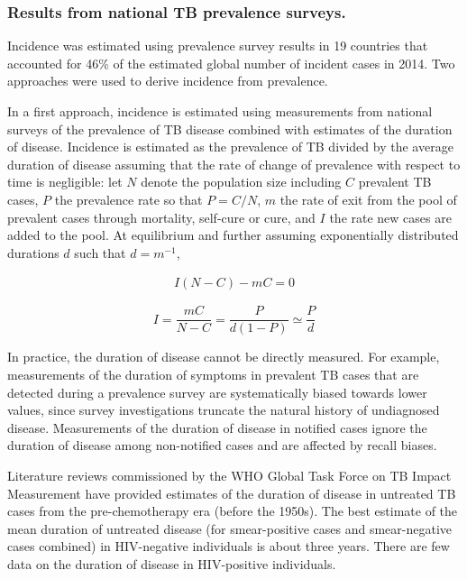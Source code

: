 \subsubsection {Results from national TB prevalence surveys.} Incidence was estimated using prevalence survey results in 19 countries that accounted for 46\% of the estimated global number of incident cases in 2014. Two approaches were used to derive incidence from prevalence.

In a first approach, incidence is estimated using measurements from national surveys of the prevalence of TB disease combined with estimates of the duration of disease. Incidence is estimated as the prevalence of TB divided by the average duration of disease assuming that the rate of change of prevalence with respect to time is negligible: let $N$ denote the population size including $C$ prevalent TB cases, $P$ the prevalence rate so that $P = C/N$, $m$ the rate of exit from the pool of prevalent cases through mortality, self-cure or cure, and $I$ the rate new cases are added to the pool. At equilibrium and further assuming exponentially distributed durations $d$ such that $d = m^{-1}$,

\begin{align*}
I(N - C) - m C = 0
\end{align*}

\begin{equation}
I = \frac{m C}{N - C} = \frac{P}{d(1 - P)} \simeq \frac{P}{d}
\label{eqn:prev2inc}
\end{equation}

In practice, the duration of disease cannot be directly measured. For example, measurements of the duration of symptoms in prevalent TB cases that are detected during a prevalence survey are systematically biased towards lower values, since survey investigations truncate the natural history of undiagnosed disease. Measurements of the duration of disease in notified cases ignore the duration of disease among non-notified cases and are affected by recall biases. 

Literature reviews commissioned by the WHO Global Task Force on TB Impact Measurement have provided estimates of the duration of disease in untreated TB cases from the pre-chemotherapy era (before the 1950s). The best estimate of the mean duration of untreated disease (for smear-positive cases and smear-negative cases combined) in HIV-negative individuals is about three years. There are few data on the duration of disease in HIV-positive individuals. 

